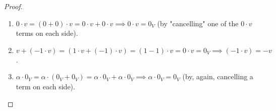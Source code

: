 \begin{proof}
    \begin{enumerate}
        \item $0 \cdot v = (0 + 0)\cdot v = 0 \cdot v + 0 \cdot v \implies 0 \cdot v = 0_V$ (by "cancelling" one of the $0 \cdot v$ terms on each side).
        \item $v + (-1 \cdot v) = (1 \cdot v + (-1) \cdot v) = (1 - 1)\cdot v = 0 \cdot v = 0_V \implies (-1 \cdot v) = -v$.
        \item $\alpha \cdot 0_V = \alpha \cdot (0_V + 0_V) = \alpha \cdot 0_V + \alpha \cdot 0_V \implies \alpha \cdot 0_V = 0_V$ (by, again, cancelling a term on each side).
    \end{enumerate}
\end{proof}